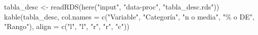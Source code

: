 \documentclass[
  spanish,
  a4paper,
  oneside]{scrbook}
\newenvironment{Shaded}{\begin{snugshade}}{\end{snugshade}}
\newcommand{\AttributeTok}[1]{\textcolor[rgb]{0.40,0.45,0.13}{#1}}
\newcommand{\FunctionTok}[1]{\textcolor[rgb]{0.28,0.35,0.67}{#1}}
\newcommand{\NormalTok}[1]{\textcolor[rgb]{0.00,0.23,0.31}{#1}}
\newcommand{\OtherTok}[1]{\textcolor[rgb]{0.00,0.23,0.31}{#1}}
\newcommand{\StringTok}[1]{\textcolor[rgb]{0.13,0.47,0.30}{#1}}
\begin{document}
\begin{Shaded}
\begin{Highlighting}[]
\NormalTok{tabla\_desc }\OtherTok{\textless{}{-}} \FunctionTok{readRDS}\NormalTok{(}\FunctionTok{here}\NormalTok{(}\StringTok{"input"}\NormalTok{, }\StringTok{"data{-}proc"}\NormalTok{, }\StringTok{"tabla\_desc.rds"}\NormalTok{))}
\FunctionTok{kable}\NormalTok{(tabla\_desc,}
      \AttributeTok{col.names =} \FunctionTok{c}\NormalTok{(}\StringTok{"Variable"}\NormalTok{, }\StringTok{"Categoría"}\NormalTok{, }\StringTok{"n o media"}\NormalTok{, }\StringTok{"\% o DE"}\NormalTok{, }\StringTok{"Rango"}\NormalTok{),}
      \AttributeTok{align =} \FunctionTok{c}\NormalTok{(}\StringTok{"l"}\NormalTok{, }\StringTok{"l"}\NormalTok{, }\StringTok{"r"}\NormalTok{, }\StringTok{"r"}\NormalTok{, }\StringTok{"c"}\NormalTok{))}
\end{Highlighting}
\end{Shaded}
\end{document}
